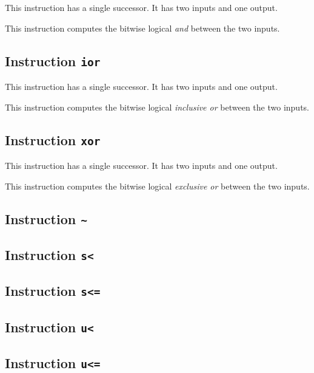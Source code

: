 This instruction has a single successor.  It has two inputs and one
output. 

This instruction computes the bitwise logical \emph{and} between the
two inputs. 

\subsection{Instruction \texttt{ior}}
\label{mir-instruction-ior}

This instruction has a single successor.  It has two inputs and one
output. 

This instruction computes the bitwise logical \emph{inclusive or}
between the two inputs.

\subsection{Instruction \texttt{xor}}
\label{mir-instruction-xor}

This instruction has a single successor.  It has two inputs and one
output. 

This instruction computes the bitwise logical \emph{exclusive or}
between the two inputs.

\subsection{Instruction \texttt{\textasciitilde}}
\label{mir-instruction-not}

\subsection{Instruction \texttt{s<}}
\label{mir-instruction-s-less}

\subsection{Instruction \texttt{s<=}}
\label{mir-instruction-s-less-or-equal}

\subsection{Instruction \texttt{u<}}
\label{mir-instruction-u-less}

\subsection{Instruction \texttt{u<=}}
\label{mir-instruction-u-less-or-equal}

